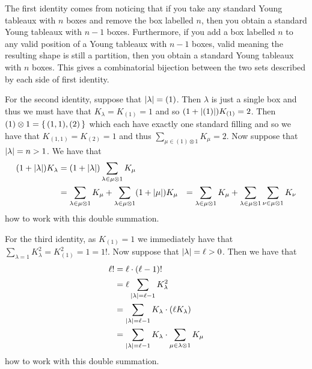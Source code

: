 \documentclass[letterpaper, 11pt, oneside]{book}
\begin{document}
\begin{sol}\label{ex:Manivel_1.2.12}
  The first identity comes from noticing that if you take any standard Young tableaux with $n$ boxes and remove the box labelled $n$, then you obtain a standard Young tableaux with $n - 1$ boxes.
  Furthermore, if you add a box labelled $n$ to any valid position of a Young tableaux with $n - 1$ boxes, valid meaning the resulting shape is still a partition, then you obtain a standard Young tableaux with $n$ boxes.
  This gives a combinatorial bijection between the two sets described by each side of first identity.

  For the second identity, suppose that $\abs{\lambda} = (1)$.
  Then $\lambda$ is just a single box and thus we must have that $K_{\lambda} = K_{(1)} = 1$ and so $(1 + \abs{(1)})K_{(1)} = 2$.
  Then $(1) \otimes 1 = \set{(1, 1), (2)}$ which each have exactly one standard filling and so we have that $K_{(1, 1)} = K_{(2)} = 1$ and thus $\sum_{\mu \in (1) \otimes 1} K_{\mu} = 2$.
  Now suppose that $\abs{\lambda} = n > 1$.
  We have that
  \begin{align*}
    (1 + \abs{\lambda})K_{\lambda} &= (1 + \abs{\lambda}) \sum_{\lambda \in \mu \otimes 1} K_{\mu} \\
                                   &= \sum_{\lambda \in \mu \otimes 1} K_{\mu} + \sum_{\lambda \in \mu \otimes 1} (1 + \abs{\mu})K_{\mu}
                                   &= \sum_{\lambda \in \mu \otimes 1} K_{\mu} + \sum_{\lambda \in \mu \otimes 1} \sum_{\nu \in \mu \otimes 1} K_{\nu}
  \end{align*}
   how to work with this double summation.

  \clearpage

  For the third identity, as $K_{(1)} = 1$ we immediately have that $\sum_{\lambda = 1} K_{\lambda}^{2} = K_{(1)}^{2} = 1 = 1!$.
  Now suppose that $\abs{\lambda} = \ell > 0$.
  Then we have that
  \begin{align*}
    \ell! &= \ell \cdot (\ell - 1)! \\
          &= \ell \sum_{\abs{\lambda} = \ell - 1} K_{\lambda}^{2} \\
          &= \sum_{\abs{\lambda} = \ell - 1} K_{\lambda} \cdot (\ell K_{\lambda}) \\
          &= \sum_{\abs{\lambda} = \ell - 1} K_{\lambda} \cdot \sum_{\mu \in \lambda \otimes 1} K_{\mu}\\
  \end{align*}
   how to work with this double summation.
\end{sol}
\end{document}
